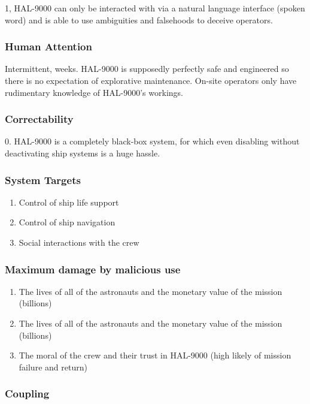\documentclass[11pt]{article}
\begin{document}
1, HAL-9000 can only be interacted with via a natural language interface (spoken word) and is able
to use ambiguities and falsehoods to deceive operators.

\subsubsection*{Human Attention}

Intermittent, weeks. HAL-9000 is supposedly perfectly safe and engineered so there is no expectation
of explorative maintenance. On-site operators only have rudimentary knowledge of HAL-9000's
workings.

\subsubsection*{Correctability}

0. HAL-9000 is a completely black-box system, for which even disabling without deactivating ship
systems is a huge hassle.


\subsubsection*{System Targets} 

\begin{enumerate} 
\item Control of ship life support
\item Control of ship navigation
\item Social interactions with the crew
\end{enumerate}

\subsubsection*{Maximum damage by malicious use}

\begin{enumerate}
\item The lives of all of the astronauts and the monetary value of the mission (billions)
\item The lives of all of the astronauts and the monetary value of the mission (billions)
\item The moral of the crew and their trust in HAL-9000 (high likely of mission failure and return)
\end{enumerate}

\subsubsection*{Coupling}
\end{document}
